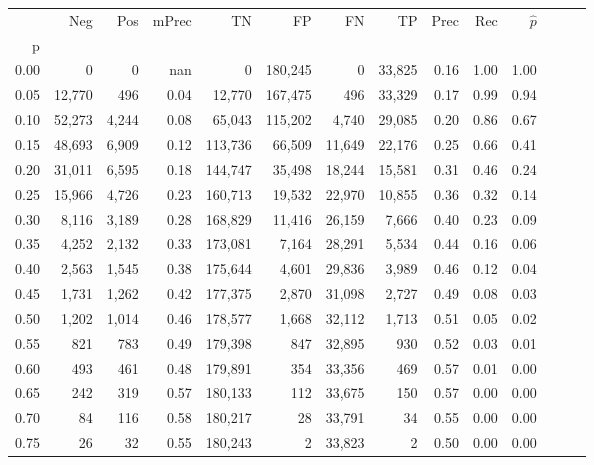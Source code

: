 \begin{tabular}{rrrrrrrrrrrrrr}
\toprule
{} &     Neg &    Pos & mPrec &       TN &       FP &      FN &      TP &  Prec &   Rec & $\hat{p}$ \\
p    &         &        &       &          &          &         &         &       &       &           \\
\midrule
0.00 &       0 &      0 &   nan &        0 &  180,245 &       0 &  33,825 &  0.16 &  1.00 &      1.00 \\
0.05 &  12,770 &    496 &  0.04 &   12,770 &  167,475 &     496 &  33,329 &  0.17 &  0.99 &      0.94 \\
0.10 &  52,273 &  4,244 &  0.08 &   65,043 &  115,202 &   4,740 &  29,085 &  0.20 &  0.86 &      0.67 \\
0.15 &  48,693 &  6,909 &  0.12 &  113,736 &   66,509 &  11,649 &  22,176 &  0.25 &  0.66 &      0.41 \\
0.20 &  31,011 &  6,595 &  0.18 &  144,747 &   35,498 &  18,244 &  15,581 &  0.31 &  0.46 &      0.24 \\
0.25 &  15,966 &  4,726 &  0.23 &  160,713 &   19,532 &  22,970 &  10,855 &  0.36 &  0.32 &      0.14 \\
0.30 &   8,116 &  3,189 &  0.28 &  168,829 &   11,416 &  26,159 &   7,666 &  0.40 &  0.23 &      0.09 \\
0.35 &   4,252 &  2,132 &  0.33 &  173,081 &    7,164 &  28,291 &   5,534 &  0.44 &  0.16 &      0.06 \\
0.40 &   2,563 &  1,545 &  0.38 &  175,644 &    4,601 &  29,836 &   3,989 &  0.46 &  0.12 &      0.04 \\
0.45 &   1,731 &  1,262 &  0.42 &  177,375 &    2,870 &  31,098 &   2,727 &  0.49 &  0.08 &      0.03 \\
0.50 &   1,202 &  1,014 &  0.46 &  178,577 &    1,668 &  32,112 &   1,713 &  0.51 &  0.05 &      0.02 \\
0.55 &     821 &    783 &  0.49 &  179,398 &      847 &  32,895 &     930 &  0.52 &  0.03 &      0.01 \\
0.60 &     493 &    461 &  0.48 &  179,891 &      354 &  33,356 &     469 &  0.57 &  0.01 &      0.00 \\
0.65 &     242 &    319 &  0.57 &  180,133 &      112 &  33,675 &     150 &  0.57 &  0.00 &      0.00 \\
0.70 &      84 &    116 &  0.58 &  180,217 &       28 &  33,791 &      34 &  0.55 &  0.00 &      0.00 \\
0.75 &      26 &     32 &  0.55 &  180,243 &        2 &  33,823 &       2 &  0.50 &  0.00 &      0.00 \\

\end{tabular}
